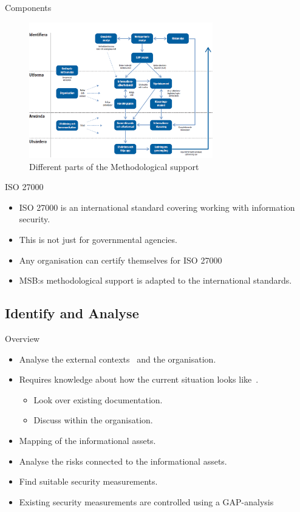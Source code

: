 \documentclass{beamer}
\begin{document}
\begin{frame}{Components}{\insertsectionhead}
  \begin{figure}
    \includegraphics[width=8cm]{Figures/oversiktsbild-over-metodstegens-olika-delar-och-hur-de-relaterar-till-varandra.png}
    \caption{Different parts of the Methodological support~\cite{msb_metodstod}}
  \end{figure}
\end{frame}

\begin{frame}{ISO 27000}{\insertsectionhead}
  \begin{itemize}
    \item ISO 27000 is an international standard covering working with
      information security.
    \item This is not just for governmental agencies.
    \item Any organisation can certify themselves for ISO 27000
    \item MSB:s methodological support is adapted to the international
      standards.
  \end{itemize}
\end{frame}

\subsection{Identify and Analyse}
\begin{frame}{Overview}{\insertsubsectionhead}
  \begin{itemize}
    \item Analyse the external contexts~ and the organisation.
    \item Requires knowledge about how the current situation looks
      like~.
      \begin{itemize}
        \item Look over existing documentation.
        \item Discuss within the organisation.
      \end{itemize}
    \item Mapping of the informational assets.
    \item Analyse the risks connected to the informational assets.
    \item Find suitable security measurements.
    \item Existing security measurements are controlled using a GAP-analysis
  \end{itemize}
\end{frame}
\end{document}
